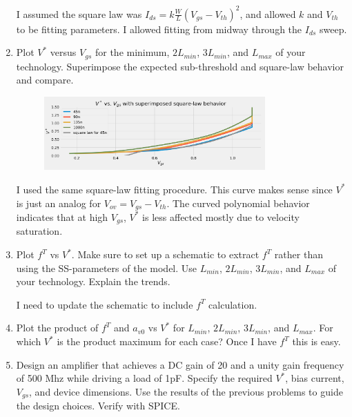 \begin{enumerate}
    I assumed the square law was $I_{ds} = k \frac{W}{L} (V_{gs} - V_{th})^2$, and allowed $k$ and $V_{th}$ to be fitting parameters. I allowed fitting from midway through the $I_{ds}$ sweep.

\item {\color{blue}Plot $V^*$ versus $V_{gs}$ for the minimum, $2 L_{min}$, $3 L_{min}$, and $L_{max}$ of your technology. Superimpose the expected sub-threshold and square-law behavior and compare.}

    \begin{figure}[H]
        \centering
        \includegraphics[width=0.8\textwidth]{figs/problem9.png}
    \end{figure}

    I used the same square-law fitting procedure. This curve makes sense since $V^*$ is just an analog for $V_{ov} = V_{gs} - V_{th}$. The curved polynomial behavior indicates that at high $V_{gs}$, $V^*$ is less affected mostly due to velocity saturation.

\item {\color{blue}Plot $f^T$ vs $V^*$. Make sure to set up a schematic to extract $f^T$ rather than using the SS-parameters of the model. Use $L_{min}$, $2 L_{min}$, $3 L_{min}$, and $L_{max}$ of your technology. Explain the trends.}

    I need to update the schematic to include $f^T$ calculation.

\item {\color{blue}Plot the product of $f^T$ and $a_{v0}$ vs $V^*$ for $L_{min}$, $2 L_{min}$, $3 L_{min}$, and $L_{max}$. For which $V^*$ is the product maximum for each case?}
    Once I have $f^T$ this is easy.

\item {\color{blue} Design an amplifier that achieves a DC gain of 20 and a unity gain frequency of 500 Mhz while driving a load of 1pF. Specify the required $V^*$, bias current, $V_{gs}$, and device dimensions. Use the results of the previous problems to guide the design choices. Verify with SPICE.}
\end{enumerate}

